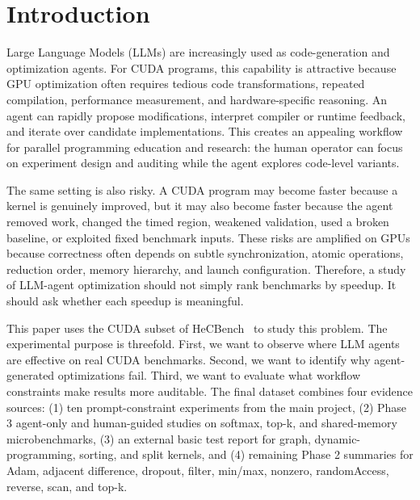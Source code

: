 \documentclass[conference]{IEEEtran}
\begin{document}
\vspace{0.5em}
\noindent{}

\section{Introduction}

Large Language Models (LLMs) are increasingly used as code-generation and optimization agents. For CUDA programs, this capability is attractive because GPU optimization often requires tedious code transformations, repeated compilation, performance measurement, and hardware-specific reasoning. An agent can rapidly propose modifications, interpret compiler or runtime feedback, and iterate over candidate implementations. This creates an appealing workflow for parallel programming education and research: the human operator can focus on experiment design and auditing while the agent explores code-level variants.

The same setting is also risky. A CUDA program may become faster because a kernel is genuinely improved, but it may also become faster because the agent removed work, changed the timed region, weakened validation, used a broken baseline, or exploited fixed benchmark inputs. These risks are amplified on GPUs because correctness often depends on subtle synchronization, atomic operations, reduction order, memory hierarchy, and launch configuration. Therefore, a study of LLM-agent optimization should not simply rank benchmarks by speedup. It should ask whether each speedup is meaningful.

This paper uses the CUDA subset of HeCBench~\cite{HeCBench} to study this problem. The experimental purpose is threefold. First, we want to observe where LLM agents are effective on real CUDA benchmarks. Second, we want to identify why agent-generated optimizations fail. Third, we want to evaluate what workflow constraints make results more auditable. The final dataset combines four evidence sources: (1) ten prompt-constraint experiments from the main project, (2) Phase 3 agent-only and human-guided studies on softmax, top-k, and shared-memory microbenchmarks, (3) an external basic test report for graph, dynamic-programming, sorting, and split kernels, and (4) remaining Phase 2 summaries for Adam, adjacent difference, dropout, filter, min/max, nonzero, randomAccess, reverse, scan, and top-k.
\end{document}
